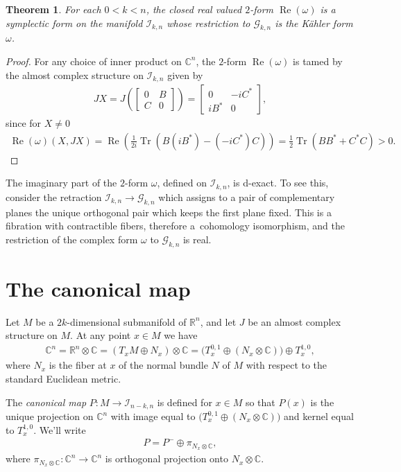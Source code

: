 \documentclass[10pt,a4paper]{amsart}
\DeclareMathOperator{\Tr}{Tr}
\newtheorem{thm}{Theorem}[section]
\numberwithin{equation}{section}
\newcommand{\R}{\mathbb{R}}
\newcommand{\CC}{\mathbb{C}}
\newcommand{\cG}{{\mathcal G}}
\newcommand{\cI}{{\mathcal I}}
\begin{document}
\begin{thm}For each $0 < k < n$, the closed real valued $2$-form $\operatorname{Re}(\omega)$ is a symplectic form on the manifold $\cI_{k,n}$ whose restriction to $\cG_{k,n}$ is the K\"ahler form $\omega$.
\end{thm}

\begin{proof} For any choice of inner product on $\CC^n$, the $2$-form $\operatorname{Re}(\omega)$ is tamed by the almost complex structure on $\cI_{k,n}$ given by
\begin{gather*}
JX = J\left(
\begin{bmatrix}
0 & B \\
C & 0
\end{bmatrix}
\right)
=
\begin{bmatrix}
0 & -iC^* \\
iB^* & 0
\end{bmatrix},
\end{gather*}
since for $X\neq 0$
\begin{gather*}
\operatorname{Re}(\omega)(X,JX) = \operatorname{Re} \left ( \frac {1}{2i} \Tr ( B(iB^*) - (-iC^*)C) \right) = \frac 1 2 \Tr(BB^* + C^*C) > 0.\tag*{\qed}
\end{gather*} \renewcommand{\qed}{}
\end{proof}

The imaginary part of the $2$-form $\omega$, defined on $\cI_{k,n}$, is d-exact. To see this, consider the retraction $\cI_{k,n} \to \cG_{k,n}$ which assigns to a pair of complementary planes the unique orthogonal pair which keeps the first plane fixed. This is a fibration with contractible fibers, therefore a~cohomology isomorphism, and the restriction of the complex form $\omega$ to $\cG_{k,n}$ is real.

\section{The canonical map} \label{sec;Pmap}

\begin{defn}
Let $M$ be a $2k$-dimensional submanifold of $\R^n$, and let $J$ be an almost complex structure on $M$. At any point $x \in M$ we have
\begin{gather*}
\CC^n = \R^n \otimes \CC = ( T_x M \oplus N_x ) \otimes \CC = \big( T^{0,1}_x \oplus ( N_x \otimes \CC ) \big) \oplus T^{1,0}_x,
\end{gather*}
where $N_x$ is the fiber at $x$ of the normal bundle $N$ of $M$ with respect to the standard Euclidean metric.

The \emph{canonical map} $P\colon M \to \cI_{n-k,n}$ is defined for $x \in M$ so that $P(x)$ is the unique projection on $\CC^n$ with image equal to $\big( T^{0,1}_x \oplus ( N_x \otimes \CC) \big)$ and kernel equal to $T^{1,0}_x$. We'll write
\begin{gather*}
P = P^- \oplus \pi_{N_x \otimes \CC},
\end{gather*}
where $\pi_{N_x \otimes \CC}\colon \CC^n \to \CC^n$ is orthogonal projection onto $N_x \otimes \CC$.
\end{defn}
\end{document}
